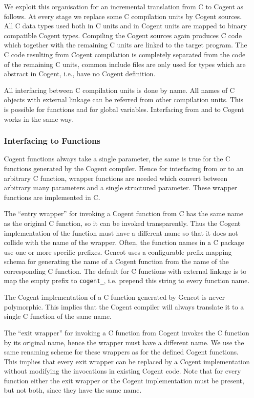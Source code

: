 \documentclass[a4paper]{report}
\newcommand{\code}[1]{\textnormal{\texttt{#1}}}
\begin{document}
We exploit this organisation for an incremental translation from C to Cogent as follows. At every stage we replace some 
C compilation units by Cogent sources. All C data types used both in C units and in Cogent units are mapped to binary compatible
Cogent types. Compiling the Cogent sources again produces C code which together with the remaining C units are linked to
the target program. The C code resulting from Cogent compilation is completely separated from the code of the remaining C units,
common include files are only used for types which are abstract in Cogent, i.e., have no Cogent definition.

All interfacing between C compilation units is done by name. All names of C objects with external linkage can be referred
from other compilation units. This is possible for functions and for global variables. Interfacing from and to Cogent works
in the same way. 

\subsubsection{Interfacing to Functions}

Cogent functions always take a single parameter, the same is true for the C functions generated by the Cogent compiler. Hence
for interfacing from or to an arbitrary C function, wrapper functions are needed which convert between arbitrary many parameters
and a single structured parameter. These wrapper functions are implemented in C. 

The ``entry wrapper'' for invoking a Cogent function 
from C has the same name as the original C function, so it can be invoked transparently. Thus the Cogent implementation of
the function must have a different name so that it does not collide with the name of the wrapper. Often, the function names
in a C package use one or more specific prefixes. Gencot uses a configurable prefix mapping schema for generating the name of
a Cogent function from the name of the corresponding C function. The default for C functions with external linkage is to 
map the empty prefix to \code{cogent\_}, i.e. prepend this string to every function name.

The Cogent implementation of a C function generated by Gencot is never polymorphic. This implies that the Cogent compiler
will always translate it to a single C function of the same name.

The ``exit wrapper'' for invoking a C function from Cogent invokes the C function by its original name, hence the wrapper
must have a different name. We use the same renaming scheme for these wrappers as for the defined Cogent functions.
This implies that every exit wrapper
can be replaced by a Cogent implementation without modifying the invocations in existing Cogent code. Note that for every
function either the exit wrapper or the Cogent implementation must be present, but not both, since they have the same name.
\end{document}
